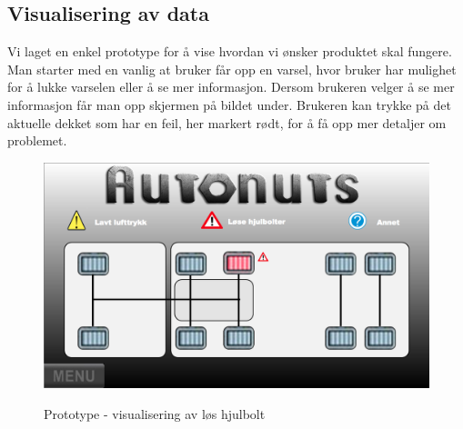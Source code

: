 \subsection{Visualisering av data}
Vi laget en enkel prototype for å vise hvordan vi ønsker produktet skal fungere. Man starter med en vanlig at bruker får opp en varsel, hvor bruker har mulighet for å lukke varselen eller å se mer informasjon. Dersom brukeren velger å se mer informasjon får man opp skjermen på bildet under. Brukeren kan trykke på det aktuelle dekket som har en feil, her markert rødt, for å få opp mer detaljer om problemet.
\begin{figure}[H]
		\centering
		\includegraphics[width=1.00\textwidth]{images/prototype.png}
		\label{fig:proto}
		\caption{Prototype - visualisering av løs hjulbolt}
	\end{figure}
